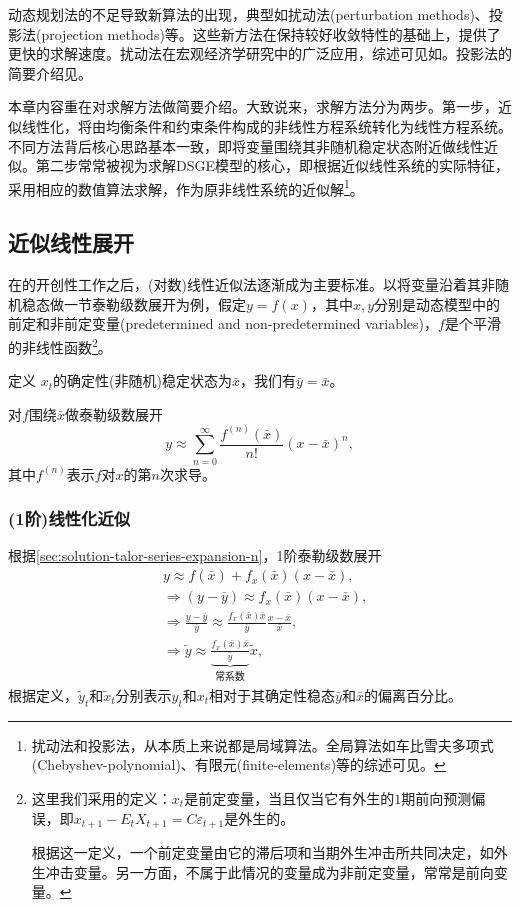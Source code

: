 动态规划法的不足导致新算法的出现，典型如扰动法(perturbation methods)、投影法(projection methods)等。这些新方法在保持较好收敛特性的基础上，提供了更快的求解速度。扰动法在宏观经济学研究中的广泛应用，综述可见如\cite{Stokey1989,Ljungqvist:2004vz}。投影法的简要介绍见\cite{Aruoba:2006cz}。

本章内容重在对求解方法做简要介绍。大致说来，求解方法分为两步。第一步，近似线性化，将由均衡条件和约束条件构成的非线性方程系统转化为线性方程系统。不同方法背后核心思路基本一致，即将变量围绕其非随机稳定状态附近做线性近似。第二步常常被视为求解DSGE模型的核心，即根据近似线性系统的实际特征，采用相应的数值算法求解，作为原非线性系统的近似解\footnote{扰动法和投影法，从本质上来说都是局域算法。全局算法如车比雪夫多项式(Chebyshev-polynomial)、有限元(finite-elements)等的综述可见\cite{Judd:1998uy}。}。

\subsection{近似线性展开}
在\cite{King:1988bk, King:1988kf, King:2002ih}的开创性工作之后，(对数)线性近似法逐渐成为主要标准。以将变量沿着其非随机稳态做一节泰勒级数展开为例，假定$y=f(x)$，其中$x,y$分别是动态模型中的前定和非前定变量(predetermined and non-predetermined variables)，$f$是个平滑的非线性函数\footnote{这里我们采用\cite{Klein:2000bc}的定义：$x_t$是前定变量，当且仅当它有外生的$1$期前向预测偏误，即$x_{t+1} - E_t X_{t+1} = C \varepsilon_{t+1}$是外生的。

根据这一定义，一个前定变量由它的滞后项和当期外生冲击所共同决定，如外生冲击变量。另一方面，不属于此情况的变量成为非前定变量，常常是前向变量。
}。

定义 $x_t$的确定性(非随机)稳定状态为$\bar{x}$，我们有$\bar{y} = \bar{x}$。

对$f$围绕$\bar{x}$做泰勒级数展开
\begin{equation}
  \label{sec:solution-talor-series-expansion-n}
  y \approx \sum_{n=0}^{\infty} \frac{f^{(n)}(\bar{x})}{n!} \left(x-\bar{x} \right)^{n},
\end{equation}
其中$f^{(n)}$表示$f$对$x$的第$n$次求导。

\subsubsection{(1阶)线性化近似}
根据\eqref{sec:solution-talor-series-expansion-n}，1阶泰勒级数展开
\begin{equation}
  \label{sec:solution-talor-series-expansion-2-lin}
\begin{split}
    &y \approx f(\bar{x}) + f_x (\bar{x}) (x-\bar{x}), \\
    & \Rightarrow (y-\bar{y}) \approx f_x(\bar{x}) (x - \bar{x}), \\
    & \Rightarrow \frac{y-\bar{y}}{\bar{y}} \approx \frac{f_x (\bar{x}) \bar{x}}{\bar{y}} \frac{x - \bar{x}}{\bar{x}}, \\
    & \Rightarrow \tilde{y} \approx \underbrace{\frac{f_x (\bar{x}) \bar{x}}{\bar{y}}}_{\text{常系数}} \tilde{x},
\end{split}
\end{equation}
根据定义，$\tilde{y}_t$和$\tilde{x}_t$分别表示$y_t$和$x_t$相对于其确定性稳态$\bar{y}$和$\bar{x}$的偏离百分比。

